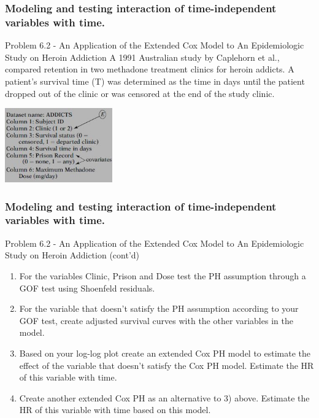\documentclass{beamer}
\theoremstyle{definition}
\begin{document}
\begin{frame}
\frametitle{Modeling and testing interaction of time-independent variables with time.} 
\begin{block}{Problem 6.2 - An Application of the Extended Cox Model to An Epidemiologic Study on Heroin
Addiction}
A 1991 Australian study by Caplehorn et al., compared retention in two methadone treatment clinics for heroin addicts. A patient’s survival time (T) was determined as the time in days until the patient dropped out of the clinic or was censored at the end of the study clinic. 
\vspace{-10pt} 
\begin{center}
\includegraphics[height=3.2cm]{CH6_Heroin1.JPG}
\end{center}
\end{block} 
\end{frame} 

\begin{frame}
\frametitle{Modeling and testing interaction of time-independent variables with time.}
\begin{block}{Problem 6.2 - An Application of the Extended Cox Model to An Epidemiologic Study on Heroin
Addiction (cont'd)}
\begin{enumerate}
\item For the variables Clinic, Prison and Dose test the PH assumption through a GOF test using Shoenfeld residuals. 
\item For the variable that doesn't satisfy the PH assumption according to your GOF test, create adjusted survival curves with the other variables in the model.  
\item Based on your log-log plot create an extended Cox PH model to estimate the effect of the variable that doesn't satisfy the Cox PH model. Estimate the HR of this variable with time. 
\item Create another extended Cox PH as an alternative to 3) above. Estimate the HR of this variable with time based on this model. 
\end{enumerate}
\end{block}
\end{frame} 
\end{document}
